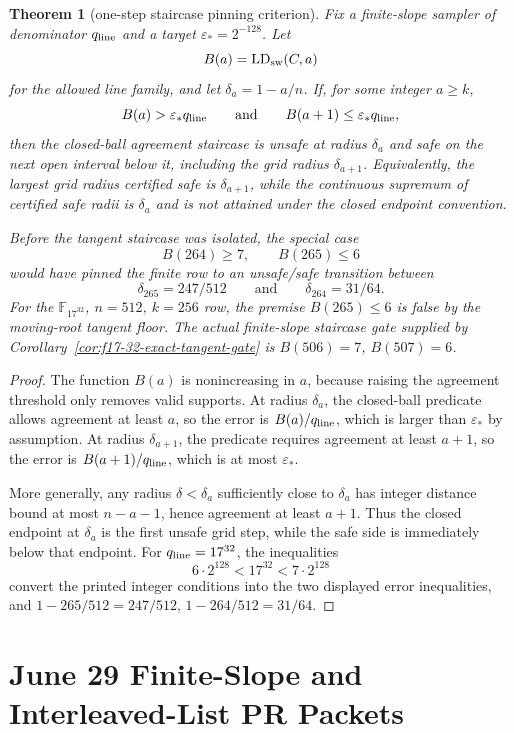 \documentclass[11pt]{article}
\newtheorem{theorem}{Theorem}
\newcommand{\F}{\mathbb F}
\newcommand{\qline}{q_{\rm line}}
\begin{document}
\begin{theorem}[one-step staircase pinning criterion]
\label{thm:one-step-staircase}
Fix a finite-slope sampler of denominator \(\qline\) and a target
\(\varepsilon_*=2^{-128}\).  Let
\[
  B(a)=\operatorname{LD}_{\rm sw}(C,a)
\]
for the allowed line family, and let \(\delta_a=1-a/n\).  If, for some integer
\(a\ge k\),
\[
  B(a)>\varepsilon_*\qline
  \qquad\text{and}\qquad
  B(a+1)\le \varepsilon_*\qline,
\]
then the closed-ball agreement staircase is unsafe at radius \(\delta_a\) and
safe on the next open interval below it, including the grid radius
\(\delta_{a+1}\).  Equivalently, the largest grid radius certified safe is
\(\delta_{a+1}\), while the continuous supremum of certified safe radii is
\(\delta_a\) and is not attained under the closed endpoint convention.

Before the tangent staircase was isolated, the special case
\[
  B(264)\ge7,
  \qquad
  B(265)\le6
\]
would have pinned the finite row to an unsafe/safe transition between
\[
  \delta_{265}=247/512
  \qquad\text{and}\qquad
  \delta_{264}=31/64.
\]
For the \(\F_{17^{32}}\), \(n=512\), \(k=256\) row, the premise
\(B(265)\le6\) is false by the moving-root tangent floor.  The actual
finite-slope staircase gate supplied by Corollary~\ref{cor:f17-32-exact-tangent-gate}
is \(B(506)=7\), \(B(507)=6\).
\end{theorem}

\begin{proof}
The function \(B(a)\) is nonincreasing in \(a\), because raising the agreement
threshold only removes valid supports.  At radius \(\delta_a\), the closed-ball
predicate allows agreement at least \(a\), so the error is \(B(a)/\qline\), which
is larger than \(\varepsilon_*\) by assumption.  At radius \(\delta_{a+1}\), the
predicate requires agreement at least \(a+1\), so the error is
\(B(a+1)/\qline\), which is at most \(\varepsilon_*\).

More generally, any radius \(\delta<\delta_a\) sufficiently close to
\(\delta_a\) has integer distance bound at most \(n-a-1\), hence agreement at
least \(a+1\).  Thus the closed endpoint at \(\delta_a\) is the first unsafe
grid step, while the safe side is immediately below that endpoint.  For
\(\qline=17^{32}\), the inequalities
\[
  6\cdot2^{128}<17^{32}<7\cdot2^{128}
\]
convert the printed integer conditions into the two displayed error inequalities,
and \(1-265/512=247/512\), \(1-264/512=31/64\).
\end{proof}

\section{June 29 Finite-Slope and Interleaved-List PR Packets}
\label{sec:jun29-pr-packets}
\end{document}

